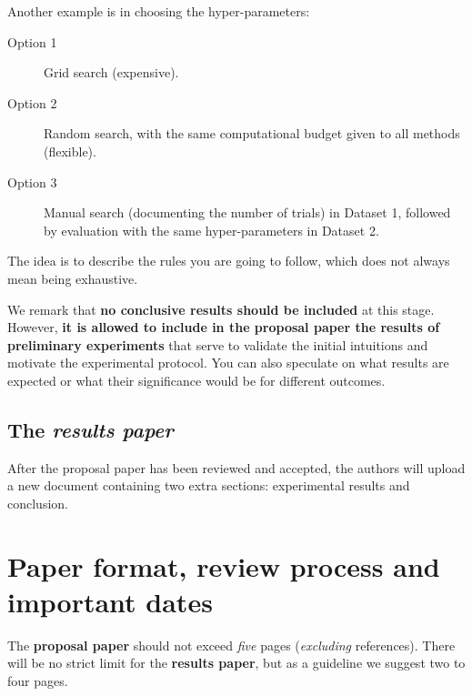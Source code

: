 \documentclass{article}
\begin{document}
Another example is in choosing the hyper-parameters:

\begin{description}
\item[Option 1] Grid search (expensive).
\item[Option 2] Random search, with the same computational budget given to all methods (flexible).
\item[Option 3] Manual search (documenting the number of trials) in Dataset 1, followed by evaluation with the same hyper-parameters in Dataset 2.
\end{description}

The idea is to describe the rules you are going to follow, which does not always mean being exhaustive.

We remark that \textbf{no conclusive results should be included} at this stage.
However, \textbf{it is allowed to include in the proposal paper the results of preliminary experiments} that serve to validate the initial intuitions and motivate the experimental protocol.
You can also speculate on what results are expected or what their significance would be for different outcomes.

\subsection{The \emph{results paper}}
\label{sec:post}
After the proposal paper has been reviewed and accepted, the authors will upload a new document containing two extra sections: experimental results and conclusion.

\section{Paper format, review process and important dates}


The \textbf{proposal paper} should not exceed \emph{five} pages (\emph{excluding} references).
There will be no strict limit for the \textbf{results paper}, but as a guideline we suggest two to four pages.
\end{document}
